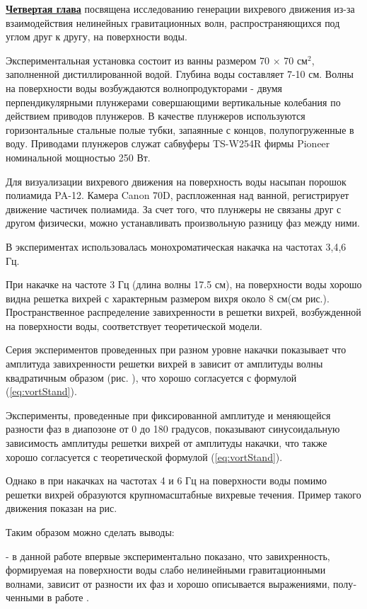 \underline{\textbf{Четвертая глава}} посвящена исследованию генерации вихревого движения из-за взаимодействия нелинейных гравитационных волн, распространяющихся под углом друг к другу, на поверхности воды.

Экспериментальная установка состоит из ванны размером 70 $\times$ 70 см$^2$, заполненной дистиллированной водой. Глубина воды составляет 7-10 см. Волны на поверхности воды возбуждаются волнопродукторами - двумя перпендикулярными плунжерами совершающими вертикальные колебания по действием приводов плунжеров. В качестве плунжеров используются горизонтальные стальные полые тубки, запаянные с концов, полупогруженные в воду. Приводами плунжеров служат сабвуферы TS-W254R фирмы Pioneer номинальной мощностью 250 Вт. 


Для визуализации вихревого движения на поверхность воды насыпан порошок полиамида PA-12. Камера Canon 70D, распложенная над ванной, регистрирует движение частичек полиамида.
За счет того, что плунжеры не связаны друг с другом физически, можно устанавливать произвольную разницу фаз между ними.

В экспериментах использовалась монохроматическая накачка на частотах 3,4,6 Гц.

При накачке на частоте 3 Гц (длина волны 17.5 см), на поверхности воды хорошо видна решетка вихрей с характерным размером вихря около 8 см(см рис.). Пространственное распределение завихренности в решетки вихрей, возбужденной на поверхности воды, соответствует теоретической модели.

Серия экспериментов проведенных при разном уровне накачки показывает что амплитуда завихренности решетки вихрей в зависит от амплитуды волны квадратичным образом (рис. ), что хорошо согласуется с формулой (\ref{eq:vortStand}).

Эксперименты, проведенные при фиксированной амплитуде и меняющейся разности фаз в диапозоне от 0 до 180 градусов, показывают синусоидальную зависимость амплитуды решетки вихрей от амплитуды накачки, что также хорошо согласуется с теоретической формулой (\ref{eq:vortStand}).

Однако в при накачках на частотах 4 и 6 Гц на поверхности воды помимо решетки вихрей образуются крупномасштабные вихревые течения. Пример такого движения показан на рис.

Таким образом можно сделать выводы:

 - в данной работе впервые экспериментально показано, что завихренность,
формируемая на поверхности воды слабо нелинейными гравитационными волнами, зависит от разности их фаз и хорошо описывается выражениями, полу­ченными в работе \cite{F6}.

